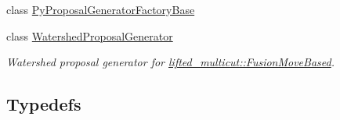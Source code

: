 \begin{DoxyCompactItemize}
\item 
class \hyperlink{classnifty_1_1graph_1_1optimization_1_1lifted__multicut_1_1PyProposalGeneratorFactoryBase}{Py\+Proposal\+Generator\+Factory\+Base}
\item 
class \hyperlink{classnifty_1_1graph_1_1optimization_1_1lifted__multicut_1_1WatershedProposalGenerator}{Watershed\+Proposal\+Generator}
\begin{DoxyCompactList}\small\item\em Watershed proposal generator for \hyperlink{classnifty_1_1graph_1_1optimization_1_1lifted__multicut_1_1FusionMoveBased}{lifted\+\_\+multicut\+::\+Fusion\+Move\+Based}. \end{DoxyCompactList}\end{DoxyCompactItemize}
\subsection*{Typedefs}
